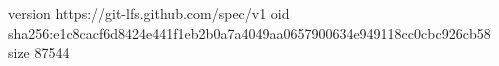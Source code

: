 version https://git-lfs.github.com/spec/v1
oid sha256:e1c8cacf6d8424e441f1eb2b0a7a4049aa0657900634e949118cc0cbc926cb58
size 87544
